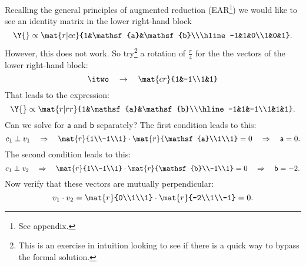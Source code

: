 Recalling the general principles of augmented reduction (EAR\footnote{See appendix.}) we would like to see an identity matrix in the lower right-hand block
\begin{equation}
\Y{} \propto \mat{r|cc}{1&\mathsf{a}&\mathsf{b}\\\hline-1&1&0\\1&0&1}. 
\end{equation}
However, this does not work. So try\footnote{This is an exercise in intuition looking to see if there is a quick way to bypass the formal solution.} a rotation of $\frac{\pi}{4}$ for the the vectors of the lower right-hand block: 
\begin{equation}
  \itwo \quad \to \quad \mat{cr}{1&-1\\1&1}
\end{equation}
That leads to the expression:
\begin{equation}
\Y{} \propto \mat{r|rr}{1&\mathsf{a}&\mathsf{b}\\\hline-1&1&-1\\1&1&1}. 
\end{equation}
Can we solve for $\mathsf{a}$ and $\mathsf{b}$ separately? The first condition leads to this:
\begin{equation}
  c_{1}\perp v_{1} \quad \Rightarrow \quad \mat{r}{1\\-1\\1} \cdot \mat{r}{\mathsf{a}\\1\\1} = 0 \quad \Rightarrow \quad \mathsf{a}=0.
\end{equation}
The second condition leads to this:
\begin{equation}
  c_{1}\perp v_{2} \quad \Rightarrow \quad \mat{r}{1\\-1\\1} \cdot \mat{r}{\mathsf{b}\\-1\\1} = 0 \quad \Rightarrow \quad \mathsf{b}=-2.
\end{equation}
Now verify that these vectors are mutually perpendicular:
\begin{equation}
  v_{1}\cdot v_{2} = \mat{r}{0\\1\\1} \cdot \mat{r}{-2\\1\\-1} = 0.
\end{equation}
	

